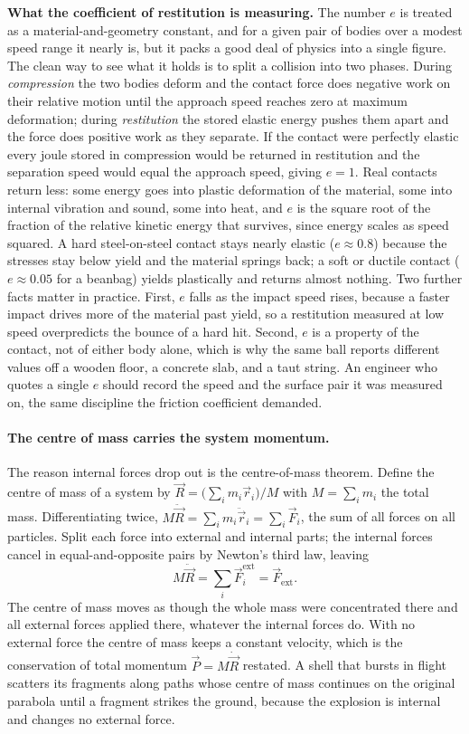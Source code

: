 \begin{mastery}
\textbf{What the coefficient of restitution is measuring.} The number
$e$ is treated as a material-and-geometry constant, and for a given pair
of bodies over a modest speed range it nearly is, but it packs a good
deal of physics into a single figure. The clean way to see what it holds
is to split a collision into two phases. During \emph{compression} the
two bodies deform and the contact force does negative work on their
relative motion until the approach speed reaches zero at maximum
deformation; during \emph{restitution} the stored elastic energy pushes
them apart and the force does positive work as they separate. If the
contact were perfectly elastic every joule stored in compression would
be returned in restitution and the separation speed would equal the
approach speed, giving $e=1$. Real contacts return less: some energy
goes into plastic deformation of the material, some into internal
vibration and sound, some into heat, and $e$ is the square root of the
fraction of the relative kinetic energy that survives, since energy
scales as speed squared. A hard steel-on-steel contact stays nearly
elastic ($e\approx 0.8$) because the stresses stay below yield and the
material springs back; a soft or ductile contact ($e\approx 0.05$ for a
beanbag) yields plastically and returns almost nothing. Two further
facts matter in practice. First, $e$ falls as the impact speed rises,
because a faster impact drives more of the material past yield, so a
restitution measured at low speed overpredicts the bounce of a hard
hit. Second, $e$ is a property of the contact, not of either body alone,
which is why the same ball reports different values off a wooden floor,
a concrete slab, and a taut string. An engineer who quotes a single $e$
should record the speed and the surface pair it was measured on, the
same discipline the friction coefficient demanded.
\end{mastery}

\paragraph{The centre of mass carries the system momentum.} The reason
internal forces drop out is the centre-of-mass theorem. Define the
centre of mass of a system by $\vec{R}=\bigl(\sum_{i}m_{i}\vec{r}_{i}
\bigr)/M$ with $M=\sum_{i}m_{i}$ the total mass. Differentiating twice,
$M\ddot{\vec{R}}=\sum_{i}m_{i}\ddot{\vec{r}}_{i}=\sum_{i}\vec{F}_{i}$,
the sum of all forces on all particles. Split each force into external
and internal parts; the internal forces cancel in equal-and-opposite
pairs by Newton's third law, leaving
\[
M\ddot{\vec{R}}=\sum_{i}\vec{F}_{i}^{\text{ext}}=\vec{F}_{\text{ext}}.
\]
The centre of mass moves as though the whole mass were concentrated
there and all external forces applied there, whatever the internal
forces do. With no external force the centre of mass keeps a constant
velocity, which is the conservation of total momentum $\vec{P}=M
\dot{\vec{R}}$ restated. A shell that bursts in flight scatters its
fragments along paths whose centre of mass continues on the original
parabola until a fragment strikes the ground, because the explosion is
internal and changes no external force.

